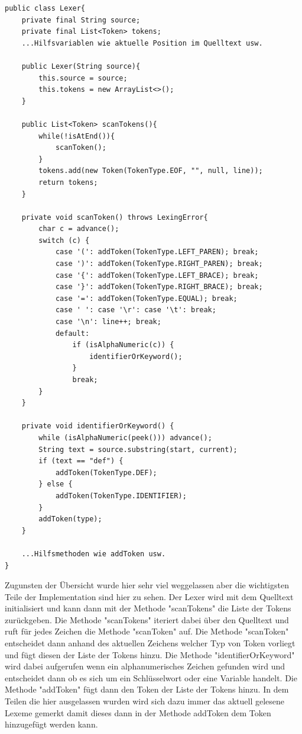 \documentclass[ngerman]{article}
\begin{document}
\begin{lstlisting}[caption={TODO: Referenz zu Anhang}, captionpos=b]
public class Lexer{
    private final String source;
    private final List<Token> tokens;
    ...Hilfsvariablen wie aktuelle Position im Quelltext usw. 

    public Lexer(String source){
        this.source = source;
        this.tokens = new ArrayList<>();
    }

    public List<Token> scanTokens(){
        while(!isAtEnd()){
            scanToken();
        }
        tokens.add(new Token(TokenType.EOF, "", null, line));
        return tokens;
    }

    private void scanToken() throws LexingError{
        char c = advance();
        switch (c) {
            case '(': addToken(TokenType.LEFT_PAREN); break;
            case ')': addToken(TokenType.RIGHT_PAREN); break;
            case '{': addToken(TokenType.LEFT_BRACE); break;
            case '}': addToken(TokenType.RIGHT_BRACE); break;
            case '=': addToken(TokenType.EQUAL); break;
            case ' ': case '\r': case '\t': break;
            case '\n': line++; break;
            default:
                if (isAlphaNumeric(c)) {
                    identifierOrKeyword();
                }
                break;
        }
    }

    private void identifierOrKeyword() {
        while (isAlphaNumeric(peek())) advance();
        String text = source.substring(start, current);
        if (text == "def") {
            addToken(TokenType.DEF);
        } else {
            addToken(TokenType.IDENTIFIER);
        }
        addToken(type);
    }

    ...Hilfsmethoden wie addToken usw.
}
\end{lstlisting}
Zugunsten der Übersicht wurde hier sehr viel weggelassen aber die wichtigsten Teile der Implementation sind hier zu sehen. Der Lexer wird mit dem Quelltext initialisiert und kann dann mit der Methode "scanTokens" die Liste der Tokens zurückgeben. Die Methode "scanTokens" iteriert dabei über den Quelltext und ruft für jedes Zeichen die Methode "scanToken" auf. Die Methode "scanToken" entscheidet dann anhand des aktuellen Zeichens welcher Typ von Token vorliegt und fügt diesen der Liste der Tokens hinzu. Die Methode "identifierOrKeyword" wird dabei aufgerufen wenn ein alphanumerisches Zeichen gefunden wird und entscheidet dann ob es sich um ein Schlüsselwort oder eine Variable handelt. Die Methode "addToken" fügt dann den Token der Liste der Tokens hinzu. In dem Teilen die hier ausgelassen wurden wird sich dazu immer das aktuell gelesene Lexeme gemerkt damit dieses dann in der Methode addToken dem Token hinzugefügt werden kann.
\end{document}
